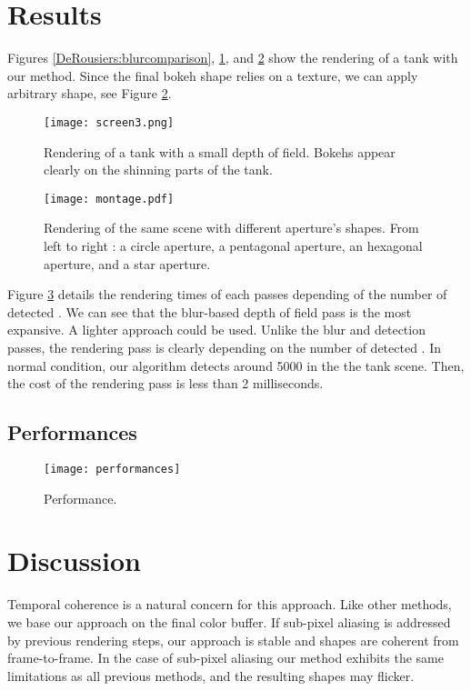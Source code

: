 \section{Results}
Figures \ref{DeRousiers:blurcomparison}, \ref{DeRousiers:bokehrendering}, and \ref{DeRousiers:bokehcomparison} show the rendering of a tank with our method. Since the final bokeh shape relies on a texture, we can apply arbitrary shape, see Figure \ref{DeRousiers:bokehcomparison}.

	\begin{figure}[htb]\centering
	\texttt{[image: screen3.png]}
	\caption{Rendering of a tank with a small depth of field. Bokehs appear clearly on the shinning parts of the tank.}
	\label{DeRousiers:bokehrendering}
	\end{figure}

	\begin{figure}[htb]\centering
	\texttt{[image: montage.pdf]}
	\caption{Rendering of the same scene with different aperture's shapes. From left to right : a circle aperture, a pentagonal aperture, an hexagonal aperture, and a star aperture.}
	\label{DeRousiers:bokehcomparison}
	\end{figure}

Figure \ref{DeRousiers:performance} details the rendering times of each passes depending of the number of detected \bokehs. We can see that the blur-based depth of field pass is the most expansive. A lighter approach could be used. Unlike the blur and detection passes, the rendering pass is clearly depending on the number of detected \bokeh. In normal condition, our algorithm detects around 5000 \bokehs in the the tank scene. Then, the cost of the rendering pass is less than 2 milliseconds.

\subsection{Performances}
	\begin{figure}[htb]\centering
	\texttt{[image: performances]}
	\caption{Performance.}
	\label{DeRousiers:performance}
	\end{figure}

\section{Discussion}
Temporal coherence is a natural concern for this approach. Like other methods, we base our approach on the final color buffer. If sub-pixel aliasing is addressed by previous rendering steps, our approach is stable and \bokeh shapes are coherent from frame-to-frame. In the case of sub-pixel aliasing our method exhibits the same limitations as all previous methods, and the resulting \bokeh shapes may flicker.

